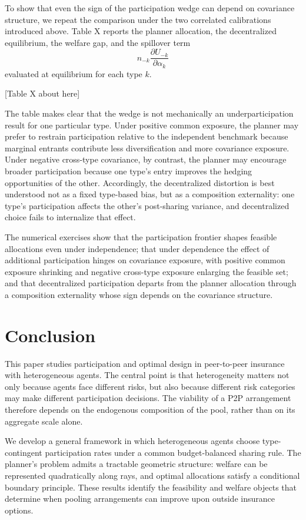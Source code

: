 \documentclass[a4paper,12pt]{article}
\theoremstyle{definition}
\theoremstyle{remark}
\newcommand{\1}{\mathbf{1}}
\begin{document}
To show that even the sign of the participation wedge can depend on covariance structure, we repeat the comparison under the two correlated calibrations introduced above. Table X reports the planner allocation, the decentralized equilibrium, the welfare gap, and the spillover term
\[
n_{-k}\frac{\partial U_{-k}}{\partial \alpha_k}
\]
evaluated at equilibrium for each type \(k\).

[Table X about here]

The table makes clear that the wedge is not mechanically an underparticipation result for one particular type. Under positive common exposure, the planner may prefer to restrain participation relative to the independent benchmark because marginal entrants contribute less diversification and more covariance exposure. Under negative cross-type covariance, by contrast, the planner may encourage broader participation because one type's entry improves the hedging opportunities of the other. Accordingly, the decentralized distortion is best understood not as a fixed type-based bias, but as a composition externality: one type's participation affects the other's post-sharing variance, and decentralized choice fails to internalize that effect.

The numerical exercises show that the participation frontier shapes feasible allocations even under independence; that under dependence the effect of additional participation hinges on covariance exposure, with positive common exposure shrinking and negative cross-type exposure enlarging the feasible set; and that decentralized participation departs from the planner allocation through a composition externality whose sign depends on the covariance structure.


\section{Conclusion}\label{sec:conclusion}

This paper studies participation and optimal design in peer-to-peer
insurance with heterogeneous agents. The central point is that
heterogeneity matters not only because agents face different risks,
but also because different risk categories may make different
participation decisions. The viability of a P2P arrangement therefore
depends on the endogenous composition of the pool, rather than on its
aggregate scale alone.

We develop a general framework in which heterogeneous agents choose
type-contingent participation rates under a common budget-balanced
sharing rule. The planner's problem admits a tractable geometric
structure: welfare can be represented quadratically along rays, and
optimal allocations satisfy a conditional boundary principle. These
results identify the feasibility and welfare objects that determine
when pooling arrangements can improve upon outside insurance options.
\end{document}
